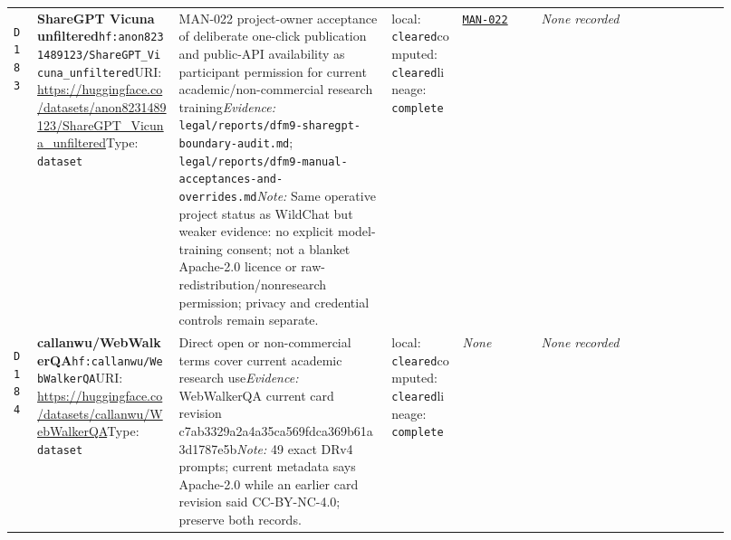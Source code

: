 \documentclass[9pt,a4paper]{article}
\newcommand{\depid}[1]{\hypertarget{dep:#1}{\texttt{#1}}}
\begin{document}
\begin{landscape}
\begin{longtable}{@{}L{0.035\linewidth}L{0.185\linewidth}L{0.27\linewidth}L{0.09\linewidth}L{0.10\linewidth}L{0.24\linewidth}@{}}
\depid{D183} & \textbf{ShareGPT Vicuna unfiltered}\newline \nolinkurl{hf:anon8231489123/ShareGPT_Vicuna_unfiltered}\newline URI: \url{https://huggingface.co/datasets/anon8231489123/ShareGPT_Vicuna_unfiltered}\newline Type: \texttt{dataset} & MAN-022 project-owner acceptance of deliberate one-click publication and public-API availability as participant permission for current academic/non-commercial research training\newline \textit{Evidence:} \nolinkurl{legal/reports/dfm9-sharegpt-boundary-audit.md}; \nolinkurl{legal/reports/dfm9-manual-acceptances-and-overrides.md}\newline \textit{Note:} Same operative project status as WildChat but weaker evidence: no explicit model-training consent; not a blanket Apache-2.0 licence or raw-redistribution/nonresearch permission; privacy and credential controls remain separate. & local: \texttt{cleared}\newline computed: \texttt{cleared}\newline lineage: \texttt{complete} & \hyperlink{manual:MAN-022}{\texttt{MAN-022}} & \textit{None recorded} \\
\depid{D184} & \textbf{callanwu/WebWalkerQA}\newline \nolinkurl{hf:callanwu/WebWalkerQA}\newline URI: \url{https://huggingface.co/datasets/callanwu/WebWalkerQA}\newline Type: \texttt{dataset} & Direct open or non-commercial terms cover current academic research use\newline \textit{Evidence:} WebWalkerQA current card revision c7ab3329a2a4a35ca569fdca369b61a3d1787e5b\newline \textit{Note:} 49 exact DRv4 prompts; current metadata says Apache-2.0 while an earlier card revision said CC-BY-NC-4.0; preserve both records. & local: \texttt{cleared}\newline computed: \texttt{cleared}\newline lineage: \texttt{complete} & \textit{None} & \textit{None recorded} \\

\end{longtable}
\end{landscape}
\end{document}

